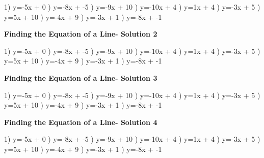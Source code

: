 \documentclass{article}%
\begin{document}
1) y=-5x + 0%
) y=-8x + -5%
) y=-9x + 10%
) y=-10x + 4%
) y=1x + 4%
) y=-3x + 5%
) y=5x + 10%
) y=-4x + 9%
) y=-3x + 1%
) y=-8x + -1%
\newline%
\newpage%
\large%
\begin{center}%
\textbf{Finding the Equation of a Line- Solution 2}%
\newline%
\end{center} \normalsize%
1) y=-5x + 0%
) y=-8x + -5%
) y=-9x + 10%
) y=-10x + 4%
) y=1x + 4%
) y=-3x + 5%
) y=5x + 10%
) y=-4x + 9%
) y=-3x + 1%
) y=-8x + -1%
\newline%
\newpage%
\large%
\begin{center}%
\textbf{Finding the Equation of a Line- Solution 3}%
\newline%
\end{center} \normalsize%
1) y=-5x + 0%
) y=-8x + -5%
) y=-9x + 10%
) y=-10x + 4%
) y=1x + 4%
) y=-3x + 5%
) y=5x + 10%
) y=-4x + 9%
) y=-3x + 1%
) y=-8x + -1%
\newline%
\newpage%
\large%
\begin{center}%
\textbf{Finding the Equation of a Line- Solution 4}%
\newline%
\end{center} \normalsize%
1) y=-5x + 0%
) y=-8x + -5%
) y=-9x + 10%
) y=-10x + 4%
) y=1x + 4%
) y=-3x + 5%
) y=5x + 10%
) y=-4x + 9%
) y=-3x + 1%
) y=-8x + -1%
\newline%
\newpage%
\end{document}
